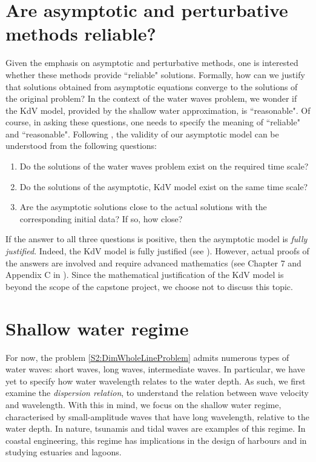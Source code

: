 \section{Are asymptotic and perturbative methods reliable?}
Given the emphasis on asymptotic and perturbative methods, one is interested whether these methods provide ``reliable" solutions. Formally, how can we justify that solutions obtained from asymptotic equations converge to the solutions of the original problem? In the context of the water waves problem, we wonder if the KdV model, provided by the shallow water approximation, is ``reasonable". Of course, in asking these questions, one needs to specify the meaning of ``reliable" and ``reasonable". Following \cite{Lannes}, the validity of our asymptotic model can be understood from the following questions:
\begin{enumerate}
\item Do the solutions of the water waves problem exist on the required time scale?
\item Do the solutions of the asymptotic, KdV model exist on the same time scale?
\item Are the asymptotic solutions close to the actual solutions with the corresponding initial data? If so, how close?
\end{enumerate}
If the answer to all three questions is positive, then the asymptotic model is \textit{fully justified}. Indeed, the KdV model is fully justified (see \cite[p. 297-298]{Lannes}). However, actual proofs of the answers are involved and require advanced mathematics (see Chapter 7 and Appendix C in \cite{Lannes}). Since the mathematical justification of the KdV model is beyond the scope of the capstone project, we choose not to discuss this topic.

\section{Shallow water regime} 
For now, the problem \eqref{S2:DimWholeLineProblem} admits numerous types of water waves: short waves, long waves, intermediate waves. In particular, we have yet to specify how water wavelength relates to the water depth. As such, we first examine the \textit{dispersion relation}, to understand the relation between wave velocity and wavelength. With this in mind, we focus on the shallow water regime, characterised by small-amplitude waves that have long wavelength, relative to the water depth. In nature, tsunamis and tidal waves are examples of this regime. In coastal engineering, this regime has implications in the design of harbours and in studying estuaries and lagoons. 

